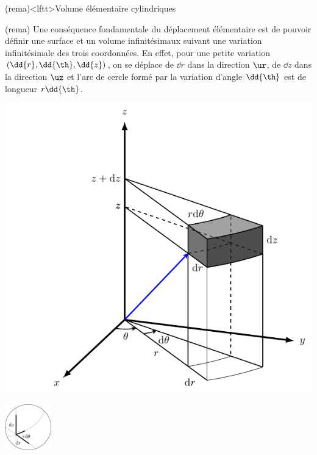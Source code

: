 \documentclass[../../main/main.tex]{subfiles}
\begin{document}
\begin{tcb}(rema)<lftt>{Volume élémentaire cylindriques}
	\begin{isd}(rema)
		Une conséquence fondamentale du déplacement élémentaire est de pouvoir définir
		une surface et un volume infinitésimaux suivant une variation infinitésimale
		des trois coordonnées.
		\smallbreak
		En effet, pour une petite variation $(\dd{r}, \dd{\th}, \dd{z})$,
		on se déplace de $\dd{r}$ dans la direction $\ur$, de $\dd{z}$ dans la
		direction $\uz$ et l'arc de cercle formé par la variation d'angle $\dd{\th}$
		est de longueur $r\dd{\th}$.
		\tcblower
		\begin{minipage}{0.49\linewidth}
			\begin{center}
				\includegraphics[width=\linewidth]{cyl_vol}
				\captionsetup{justification=centering}
			\end{center}
		\end{minipage}
		\hfill
		\begin{minipage}{0.49\linewidth}
			\begin{center}
				\includegraphics[height=2cm]{zoom_cyl_lgn}

\end{center}
\end{minipage}
\end{isd}
\end{tcb}
\end{document}
